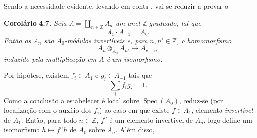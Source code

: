 Sendo a necessidade evidente, levando em conta
, vai-se reduzir
a provar o

\medskip
\noindent{}\textbf{Corolário 4.7.}
\textit{Seja \(A=\coprod_{n\in\mathbb Z}A_n\) um anel
\(\mathbb Z\)-graduado, tal que}
\[
  A_1\mathbin{\cdot}A_{-1}=A_0.
\]
\textit{Então os \(A_n\) são \(A_0\)-módulos invertíveis e, para
\(n,n'\in\mathbb Z\), o homomorfismo}
\[
  A_n\otimes_{A_0}A_{n'}\longrightarrow A_{n+n'}
\]
\textit{induzido pela multiplicação em \(A\) é um isomorfismo.}

Por hipótese, existem \(f_i\in A_1\) e \(g_i\in A_{-1}\) tais que
\[
  \sum_i f_ig_i=1.
\]
Como a conclusão a estabelecer é local sobre \(\operatorname{Spec}(A_0)\),
reduz-se (por localização com o auxílio dos \(f_i\)) ao caso em que
existe \(f\in A_1\), elemento \emph{invertível} de \(A_1\). Então, para
todo \(n\in\mathbb Z\), \(f^n\) é um elemento invertível de \(A_n\),
logo define um isomorfismo \(h\mapsto f^nh\) de \(A_0\) sobre \(A_n\).
Além disso,
